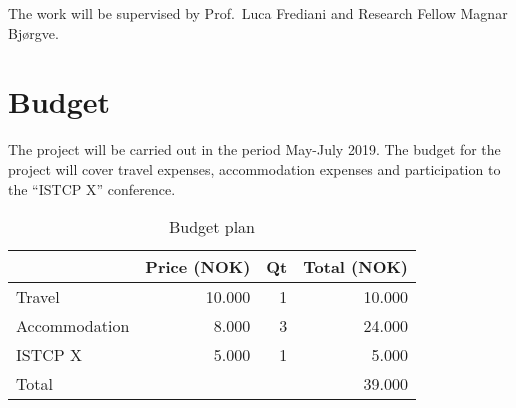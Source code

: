 \documentclass[12pt]{article}
\begin{document}
The work will be supervised by Prof.~Luca Frediani and Research Fellow
Magnar Bj\o rgve.

\section{Budget}

The project will be carried out in the period May-July 2019.
The budget for the project will cover travel expenses, accommodation
expenses and participation to the ``ISTCP X'' conference.

\begin{table}[!htb]
  \begin{tabular}{l|r|r|r}
               & Price (NOK) & Qt & Total (NOK)\\
\hline
    Travel        & 10.000      & 1  & 10.000     \\
    Accommodation &  8.000      & 3  & 24.000     \\
    ISTCP X       &  5.000      & 1  &  5.000     \\
\hline
    Total         &             &    & 39.000     \\
  \end{tabular}
  \caption{Budget plan}
  \label{tab:budget}
\end{table}



\end{document}
